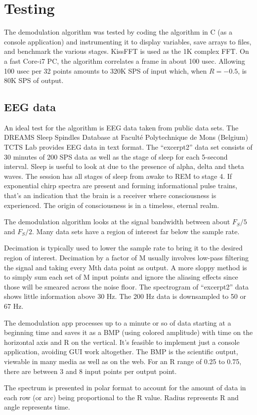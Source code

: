 \section{Testing}

The demodulation algorithm was tested by coding the algorithm in C (as a console
application) and instrumenting it to display variables,
save arrays to files, and benchmark the various stages.
KissFFT is used as the 1K complex FFT.
On a fast Core-i7 PC, the algorithm correlates a frame in about 100 usec.
Allowing 100 usec per 32 points amounts to 320K SPS of input which, when $R=-0.5$,
is 80K SPS of output.

\subsection{EEG data}

An ideal test for the algorithm is EEG data taken from public data sets.
The DREAMS Sleep Spindles Database at Facult\'e Polytechnique de Mons (Belgium)
TCTS Lab \cite{Devuyst} provides EEG data in text format. 
The ``excerpt2'' data set consists of 30 minutes of 200 SPS data as well as the
stage of sleep for each 5-second interval.
Sleep is useful to look at due to the presence of alpha, delta and theta waves. 
The session has all stages of sleep from awake to REM to stage 4.
If exponential chirp spectra are present and forming informational pulse trains,
that's an indication that the brain is a receiver where consciousness is
experienced. The origin of consciousness is in a timeless, eternal realm.

The demodulation algorithm looks at the signal bandwidth between about
$F_S/5$ and $F_S/2$.
Many data sets have a region of interest far below the sample rate.

Decimation is typically used to lower the sample rate to bring it to the
desired region of interest. 
Decimation by a factor of M usually involves low-pass filtering the signal
and taking every Mth data point as output.
A more sloppy method is to simply sum each set of M input points and ignore
the aliasing effects since those will be smeared across the noise floor.
The spectrogram of ``excerpt2'' data shows little information above 30 Hz.
The 200 Hz data is downsampled to 50 or 67 Hz.

The demodulation app processes up to a minute or so of data starting at a 
beginning time and saves it as a BMP (using colored amplitude) with time on the
horizontal axis and R on the vertical.
It's feasible to implement just a console application,
avoiding GUI work altogether.
The BMP is the scientific output, viewable in many media as well as on the web.
For an R range of 0.25 to 0.75, there are between 3 and 8 input points per 
output point. 

The spectrum is presented in polar format to account for the amount of data in
each row (or arc) being proportional to the R value.
Radius represents R and angle represents time.


